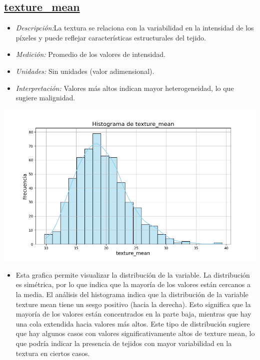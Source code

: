 \documentclass[a4paper, 12pt]{article}
\begin{document}
\subsection*{\underline{texture\_mean}}


    \begin{itemize}
	\item \textit{Descripción:}La textura se relaciona con la variabilidad en la intensidad de los píxeles y puede reflejar características estructurales del tejido.
	\item \textit{Medición:} Promedio de los valores de intensidad.
	\item \textit{Unidades:} Sin unidades (valor adimensional).
	\item \textit{Interpretación:} Valores más altos indican mayor heterogeneidad, lo que sugiere malignidad.
\end{itemize}

	\includegraphics[width=\textwidth]{../Plots/plots_stats/texture_mean/histograma_texture_mean.png}
\begin{itemize}
\item Esta grafica permite visualizar la distribución de la variable.
La distribución es simétrica, por lo que indica que la mayoría de los valores están cercanos a la media.
El análisis del histograma indica que la distribución de la variable texture mean tiene un sesgo positivo (hacia la derecha). Esto significa que la mayoría de los valores están concentrados en la parte baja, mientras que hay una cola extendida hacia valores más altos.
Este tipo de distribución sugiere que hay algunos casos con valores significativamente altos de texture mean, lo que podría indicar la presencia de tejidos con mayor variabilidad en la textura en ciertos casos.
\end{itemize}
\end{document}
